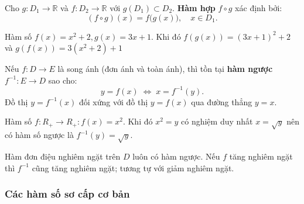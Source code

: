 \documentclass[12pt,a4paper]{article}
\begin{document}
\begin{dinhnghia}[title={Hàm số hợp}]
  Cho $g: D_1 \to \mathbb{R}$ và $f: D_2 \to \mathbb{R}$ với $g(D_1) \subset D_2$. \textbf{Hàm hợp} $f \circ g$ xác định bởi:
  \[
    (f \circ g)(x) = f\bigl(g(x)\bigr),\quad x \in D_1.
  \]
\end{dinhnghia}

\begin{vidu}
    Hàm số $f(x) = x^2 + 2, g(x) = 3x + 1$. Khi đó $f(g(x)) = (3x+1)^2 + 2$ và $g(f(x)) = 3(x^2 + 2) + 1$
\end{vidu}

\begin{dinhnghia}[title={Hàm số ngược}]
  Nếu $f: D \to E$ là song ánh (đơn ánh và toàn ánh), thì tồn tại \textbf{hàm ngược} $f^{-1}: E \to D$ sao cho:
  \[
    y = f(x) \;\Leftrightarrow\; x = f^{-1}(y).
  \]
  Đồ thị $y = f^{-1}(x)$ đối xứng với đồ thị $y = f(x)$ qua đường thẳng $y = x$.
\end{dinhnghia}

\begin{vidu}
    Hàm số $f: R_+ \to R_+: f(x) = x^2$. Khi đó $x^2 = y$ có nghiệm duy nhất $x = \sqrt{y}$ nên có hàm số ngược là $f^{-1}(y) = \sqrt{y}$.
\end{vidu}

\begin{luuy}
  Hàm đơn điệu nghiêm ngặt trên $D$ luôn có hàm ngược. Nếu $f$ tăng nghiêm ngặt thì $f^{-1}$ cũng tăng nghiêm ngặt; tương tự với giảm nghiêm ngặt.
\end{luuy}

\subsubsection{Các hàm số sơ cấp cơ bản}
\end{document}
